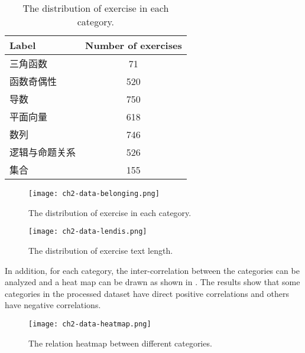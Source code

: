 \begin{table}[htb]
    \caption{The distribution of exercise in each category.}\label{tbl:ch2-rawdata-dist}
    \centering
    \begin{tabular}{l c}
        \toprule
        Label          & Number of exercises \\
        \midrule
        三角函数       & 71                  \\
        函数奇偶性     & 520                 \\
        导数           & 750                 \\
        平面向量       & 618                 \\
        数列           & 746                 \\
        逻辑与命题关系 & 526                 \\
        集合           & 155                 \\
        \bottomrule
    \end{tabular}
\end{table}

\begin{figure}[htb]
    \centering
    \texttt{[image: ch2-data-belonging.png]}
    \caption{The distribution of exercise in each category.}\label{fig:ch2-data-belonging}
\end{figure}

\begin{figure}[htb]
    \centering
    \texttt{[image: ch2-data-lendis.png]}
    \caption{The distribution of exercise text length.}\label{fig:ch2-data-lendis}
\end{figure}

In addition, for each category, the inter-correlation between the categories can be analyzed and a heat map can be drawn as shown in \figname{\ref{fig:ch2-data-heatmap}}. The results show that some categories in the processed dataset have direct positive correlations and others have negative correlations.
\begin{figure}[htb]
    \centering
    \texttt{[image: ch2-data-heatmap.png]}
    \caption{The relation heatmap between different categories.}\label{fig:ch2-data-heatmap}
\end{figure}



